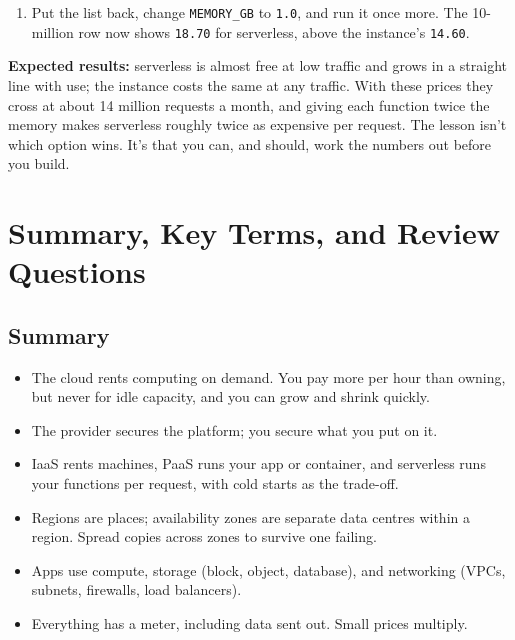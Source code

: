 \begin{enumerate}
  \begin{codeblock}
  \begin{Verbatim}[formatcom=\outputstyle]
   requests/month        VM  serverless
       14,000,000     14.60       14.49
       15,000,000     14.60       15.53
  \end{Verbatim}
  \end{codeblock}
\item
  Put the list back, change \texttt{MEMORY\_GB} to \texttt{1.0}, and run it once more. The 10-million row now shows \texttt{18.70} for serverless, above the instance's \texttt{14.60}.
\end{enumerate}

\textbf{Expected results:} serverless is almost free at low traffic and grows in a straight line with use; the instance costs the same at any traffic. With these prices they cross at about 14 million requests a month, and giving each function twice the memory makes serverless roughly twice as expensive per request. The lesson isn't which option wins. It's that you can, and should, work the numbers out before you build.

\section{Summary, Key Terms, and Review Questions}\label{03-the-cloud-renting-computers-by-the-minute:summary-key-terms-and-review-questions}

\subsection*{Summary}\label{03-the-cloud-renting-computers-by-the-minute:summary}

\begin{itemize}
\tightlist
\item
  The cloud rents computing on demand. You pay more per hour than owning, but never for idle capacity, and you can grow and shrink quickly.
\item
  The provider secures the platform; you secure what you put on it.
\item
  IaaS rents machines, PaaS runs your app or container, and serverless runs your functions per request, with cold starts as the trade-off.
\item
  Regions are places; availability zones are separate data centres within a region. Spread copies across zones to survive one failing.
\item
  Apps use compute, storage (block, object, database), and networking (VPCs, subnets, firewalls, load balancers).
\item
  Everything has a meter, including data sent out. Small prices multiply.
\end{itemize}

